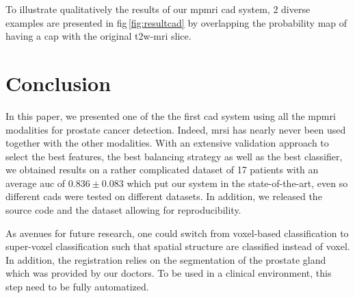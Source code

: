 \documentclass[conference]{sty/ieeeconf}
\begin{document}
To illustrate qualitatively the results of our \ac{mpmri} \ac{cad}
system, 2 diverse examples are presented in
\acs{fig}\,\ref{fig:resultcad} by overlapping the probability map of
having a \ac{cap} with the original \ac{t2w}-\ac{mri} slice.

\section{Conclusion}

In this paper, we presented one of the the first \ac{cad} system using all
the \ac{mpmri} modalities for prostate cancer detection.
Indeed, \ac{mrsi} has nearly never been used together with the other
modalities.
With an extensive validation approach to select the best
features, the best balancing strategy as well as the best classifier,
we obtained results on a rather complicated dataset of 17 patients
with an average \ac{auc} of $0.836 \pm 0.083$ which put our system in the
state-of-the-art, even so different \ac{cad}s were tested on different
datasets.
In addition, we released the source code and the dataset allowing for
reproducibility.

As avenues for future research, one could switch from voxel-based
classification to super-voxel classification such that spatial structure are
classified instead of voxel.
In addition, the registration relies on the segmentation of the prostate gland
which was provided by our doctors.
To be used in a clinical environment, this step need to be fully automatized.



\end{document}
